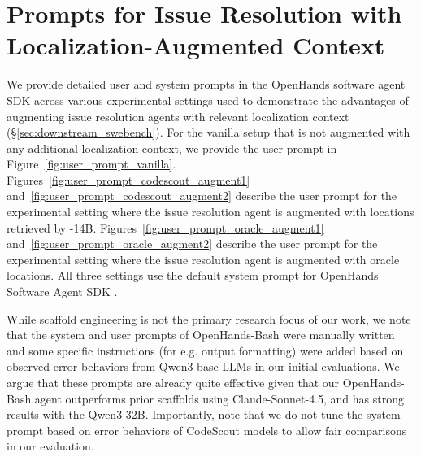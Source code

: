 \section{Prompts for Issue Resolution with Localization-Augmented Context}\label{appendix:prompts_swe_bench}
We provide detailed user and system prompts in the OpenHands software agent SDK across various experimental settings used to demonstrate the advantages of augmenting issue resolution agents with relevant localization context (\S\ref{sec:downstream_swebench}). For the vanilla setup that is not augmented with any additional localization context, we provide the user prompt in Figure~\ref{fig:user_prompt_vanilla}. Figures~\ref{fig:user_prompt_codescout_augment1} and~\ref{fig:user_prompt_codescout_augment2} describe the user prompt for the experimental setting where the issue resolution agent is augmented with locations retrieved by \methodname-14B. Figures~\ref{fig:user_prompt_oracle_augment1} and~\ref{fig:user_prompt_oracle_augment2} describe the user prompt for the experimental setting where the issue resolution agent is augmented with oracle locations. All three settings use the default system prompt for OpenHands Software Agent SDK \citep{wang2025openhandssoftwareagentsdk}.

While scaffold engineering is not the primary research focus of our work, we note that the system and user prompts of OpenHands-Bash were manually written and some specific instructions (for e.g. output formatting) were added based on observed error behaviors from Qwen3 base LLMs in our initial evaluations. We argue that these prompts are already quite effective given that our OpenHands-Bash agent outperforms prior scaffolds using Claude-Sonnet-4.5, and has strong results with the Qwen3-32B. Importantly, note that we do not tune the system prompt based on error behaviors of CodeScout models to allow fair comparisons in our evaluation.

